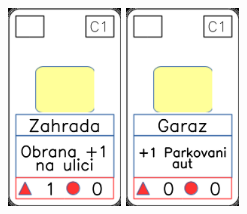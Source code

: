 \documentclass[a4paper]{article}
\begin{document}
	\includegraphics[width=3.0cm]{img-2_25}
	\includegraphics[width=3.0cm]{img-2_10}
\end{document}
